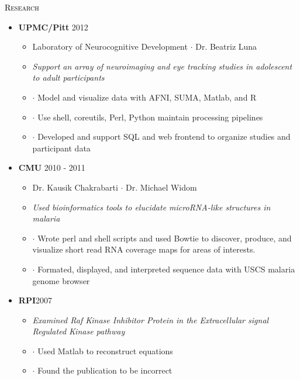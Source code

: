 \begin{minipage}{\firstWidth}
\large \textcolor{Black}{\textsc{Research}}
\end{minipage}
\begin{minipage}{\secondWidth}
\begin{itemize}
\item{\textbf{UPMC/Pitt} \hfill 2012}
	\begin{itemize}
	\item{ Laboratory of Neurocognitive Development $\cdot$ Dr. Beatriz Luna}
	\item {\em Support an array of neuroimaging and eye tracking studies in adolescent to adult participants }
	\item $\cdot$ Model and visualize data with AFNI, SUMA, Matlab, and R 
	\item $\cdot$ Use shell, coreutils, Perl, Python maintain processing pipelines
	\item $\cdot$ Developed and support SQL and web frontend to organize studies and participant data
	\end{itemize}
\item{\textbf{CMU} \hfill 2010 - 2011} 
	\begin{itemize}
	\item{Dr. Kausik Chakrabarti $\cdot$ Dr. Michael Widom}
	\item {\em Used bioinformatics tools to elucidate microRNA-like structures in malaria}
	\item $\cdot$ Wrote perl and shell scripts and used Bowtie to discover, produce, and visualize short read RNA coverage maps for areas of interests.  
	\item $\cdot$ Formated, displayed, and interpreted sequence data with USCS malaria genome browser
	\end{itemize}
\item{\textbf{RPI}\hfill 2007}
	\begin{itemize}
	\item{\em Examined Raf Kinase Inhibitor Protein in the Extracellular signal Regulated Kinase  pathway}
	\item $\cdot$ Used Matlab to reconstruct equations
	\item $\cdot$ Found the publication to be incorrect
	\end{itemize}
\end{itemize}
\end{minipage}
